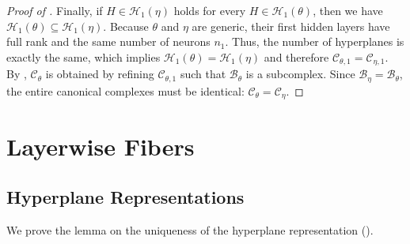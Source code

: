 \documentclass{article}
\theoremstyle{definition}
\newcommand{\complex}{\mathcal{C}}
\newcommand{\hyperplanes}[2]{\mathcal{H}_{#1}(#2)}
\newcommand{\bcomplex}[1]{\mathcal{B}_{#1}}
\begin{document}
\begin{proof}[Proof of ]
\medskip
Finally, if $H \in \hyperplanes{1}{\eta}$ holds for every $H \in \hyperplanes{1}{\theta}$, then we have $\hyperplanes{1}{\theta} \subseteq \hyperplanes{1}{\eta}$. 
Because $\theta$ and $\eta$ are generic, their first hidden layers have full rank and the same number of neurons $n_1$. 
Thus, the number of hyperplanes is exactly the same, which implies $\hyperplanes{1}{\theta} = \hyperplanes{1}{\eta}$ and therefore $\complex_{\theta,1}=\complex_{\eta,1}$. 
By , $\complex_\theta$ is obtained by refining $\complex_{\theta,1}$ such that $\bcomplex{\theta}$ is a subcomplex. Since $\bcomplex{\eta}=\bcomplex{\theta}$, the entire canonical complexes must be identical: $\complex_\theta=\complex_\eta$. 
\end{proof}



\section{Layerwise Fibers}
\label{app:layerwise_fibers}

\subsection{Hyperplane Representations}

We prove the lemma on the uniqueness of the hyperplane representation (). 

\lemhyperplanerepresentation* 
\end{document}
